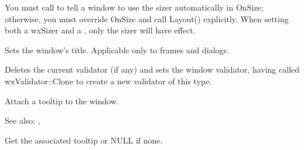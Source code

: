 


You must call  to tell a window to use
the sizer automatically in OnSize; otherwise, you must override OnSize and call Layout()
explicitly. When setting both a wxSizer and a ,
only the sizer will have effect.

\label{wxwindowsettitle}


Sets the window's title. Applicable only to frames and dialogs.





\label{wxwindowsetvalidator}


Deletes the current validator (if any) and sets the window validator, having called wxValidator::Clone to
create a new validator of this type.

\label{wxwindowsettooltip}



Attach a tooltip to the window.

See also: ,


\label{wxwindowgettooltip}


Get the associated tooltip or NULL if none.



\label{wxwindowsetwindowstyle}


